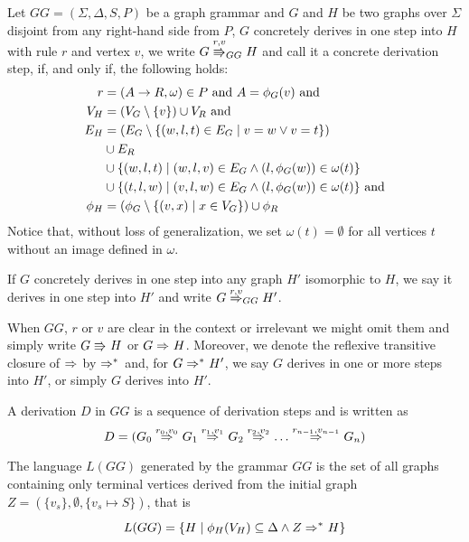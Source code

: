\documentclass[]{report}
\begin{document}
\begin{definition}
	Let $GG = (\Sigma, \Delta, S, P)$ be a graph grammar and $G$ and $H$ be two graphs over $\Sigma$ disjoint from any right-hand side from $P$, $G$ concretely derives in one step into $H$ with rule $r$ and vertex $v$, we write $G \cderiv{r}{v}{GG} H$ and call it a concrete derivation step, if, and only if, the following holds:
	\begin{align*}
		r & = (A \to R, \omega) \in P \text{ and } A = \phi_G(v) \text{ and} \\
		V_H  & = (V_G \setminus \{v\}) \cup V_R \text{ and} \\
		E_H & = (E_G \setminus \{(w,l,t) \in E_G \; | \; v = w \lor v = t\}) \\
		& \cup E_R \\
		& \cup \{(w,l,t) \; | \; (w,l,v) \in E_G \land (l,\phi_G(w)) \in \omega(t)\} \\
		& \cup \{(t,l,w) \; | \; (v,l,w) \in E_G \land (l,\phi_G(w)) \in \omega(t)\} \text{ and} \\
		\phi_H & = (\phi_G \setminus \{(v,x) \; | \; x \in V_G \}) \cup \phi_R
	\end{align*}
	Notice that, without loss of generalization, we set $\omega(t) = \emptyset$ for all vertices $t$ without an image defined in $\omega$.
	
	If $G$ concretely derives in one step into any graph $H'$ isomorphic to $H$, we say it derives in one step into $H'$ and write $G \deriv{r}{v}{GG} H'$. 
	
	When $GG$, $r$ or $v$ are clear in the context or irrelevant we might omit them and simply write $G \cderiv{}{}{} H$ or $G \deriv{}{}{} H$. Moreover, we denote the reflexive transitive closure of $\deriv{}{}{}$ by $\derivtr{}{}{}$ and, for $G \derivtr{}{}{} H'$, we say $G$ derives in one or more steps into $H'$, or simply $G$ derives into $H'$.
\end{definition}


\begin{definition}
	A derivation $D$ in $GG$ is a sequence of derivation steps and is written as
	\[ 
		D = (G_0 \deriv{r_0}{v_0}{} G_1 \deriv{r_1}{v_1}{} G_2 \deriv{r_2}{v_2}{} \dots \deriv{r_{n-1}}{v_{n-1}}{} G_n)
	\]
\end{definition}

\begin{definition}
	The language $L(GG)$ generated by the grammar $GG$ is the set of all graphs containing only terminal vertices derived from the initial graph $Z = (\{v_s\},\emptyset,\{v_s \mapsto S\})$, that is
	\[
		L(GG) = \{H \st \phi_H(V_H) \subseteq \Delta \land Z \derivtr{}{}{} H\}
	\]
\end{definition}
\end{document}
